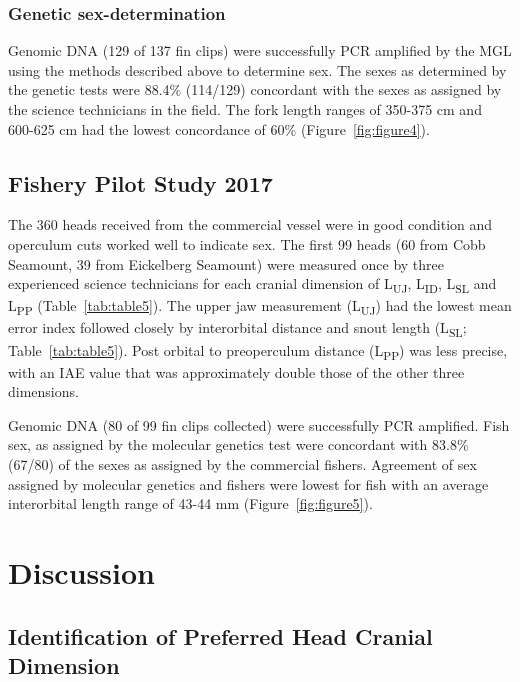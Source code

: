 \documentclass[12pt]{article}\usepackage[]{graphicx}\usepackage[]{color}
\begin{document}
\hypertarget{genetic-sex-determination}{%
\subsubsection{Genetic sex-determination}\label{genetic-sex-determination}}

Genomic DNA (129 of 137 fin clips) were successfully PCR amplified by the MGL using the methods described above to determine sex. The sexes as determined by the genetic tests were 88.4\% (114/129) concordant with the sexes as assigned by the science technicians in the field. The fork length ranges of 350-375 cm and 600-625 cm had the lowest concordance of 60\% (Figure~\ref{fig:figure4}).

\hypertarget{fishery-pilot-study-2017-1}{%
\subsection{Fishery Pilot Study 2017}\label{fishery-pilot-study-2017-1}}

The 360 heads received from the commercial vessel were in good condition and operculum cuts worked well to indicate sex. The first 99 heads (60 from Cobb Seamount, 39 from Eickelberg Seamount) were measured once by three experienced science technicians for each cranial dimension of L\textsubscript{UJ}, L\textsubscript{ID}, L\textsubscript{SL} and L\textsubscript{PP} (Table~\ref{tab:table5}). The upper jaw measurement (L\textsubscript{UJ}) had the lowest mean error index followed closely by interorbital distance and snout length (L\textsubscript{SL}; Table~\ref{tab:table5}). Post orbital to preoperculum distance (L\textsubscript{PP}) was less precise, with an IAE value that was approximately double those of the other three dimensions.

Genomic DNA (80 of 99 fin clips collected) were successfully PCR amplified. Fish sex, as assigned by the molecular genetics test were concordant with 83.8\% (67/80) of the sexes as assigned by the commercial fishers. Agreement of sex assigned by molecular genetics and fishers were lowest for fish with an average interorbital length range of 43-44 mm (Figure~\ref{fig:figure5}).

\hypertarget{discussion}{%
\section{Discussion}\label{discussion}}

\hypertarget{identification-of-preferred-head-cranial-dimension}{%
\subsection{Identification of Preferred Head Cranial Dimension}\label{identification-of-preferred-head-cranial-dimension}}
\end{document}
